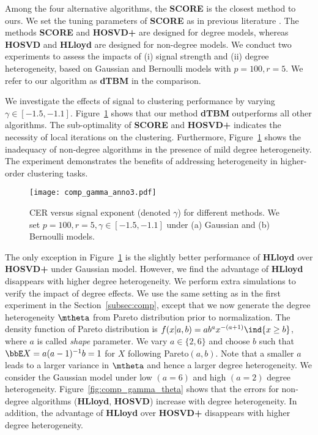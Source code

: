 \documentclass[lettersize,onecolumn,journal]{IEEEtran}
\theoremstyle{definition}
\theoremstyle{definition}
\begin{document}
Among the four alternative algorithms, the \textbf{\small SCORE} is the closest method to ours. We set the tuning parameters of \textbf{\small SCORE} as in previous literature \citep{ke2019community}. The methods \textbf{\small SCORE} and \textbf{\small HOSVD+} are designed for degree models, whereas \textbf{\small HOSVD} and \textbf{\small HLloyd} are designed for non-degree models. We conduct two experiments to assess the impacts of (i) signal strength and (ii) degree heterogeneity, based on Gaussian and Bernoulli models with $ p = 100, r = 5$. We refer to our algorithm as \textbf{\small dTBM} in the comparison. 

We investigate the effects of signal to clustering performance by varying $\gamma \in [-1.5, -1.1]$. Figure~\ref{fig:comp_gamma} shows that our method \textbf{\small dTBM} outperforms all other algorithms. The sub-optimality of \textbf{\small SCORE} and \textbf{\small HOSVD+} indicates the necessity of local iterations on the clustering. Furthermore,  Figure~\ref{fig:comp_gamma} shows the inadequacy of non-degree algorithms in the presence of mild degree heterogeneity. 
The experiment demonstrates the benefits of addressing heterogeneity in higher-order clustering tasks.   


\begin{figure}[h!]
    \centering
    \texttt{[image: comp\_gamma\_anno3.pdf]}
    \caption{CER versus signal exponent (denoted $\gamma$) for different methods. We set $p = 100, r = 5, \gamma \in [-1.5, -1.1]$ under (a) Gaussian and (b) Bernoulli models.}
    \label{fig:comp_gamma}
\end{figure}


The only exception in Figure~\ref{fig:comp_gamma} is the slightly better performance of \textbf{\small HLloyd} over \textbf{\small HOSVD+} under Gaussian model. However, we find the advantage of \textbf{\small HLloyd} disappears with higher degree heterogeneity. We perform extra simulations to verify the impact of degree effects. We use the same setting as in the first experiment in the Section~\ref{subsec:comp}, except that we now generate the degree heterogeneity $\mtheta$ from Pareto distribution prior to normalization. The density function of Pareto distribution is $f(x|a,b) = a b^a x^{-(a+1)} \ind\{ x \geq b \}$, where $a$ is called \emph{shape} parameter. We vary $a \in \{2,6\}$ and choose $b$ such that $\bbE X = a(a - 1)^{-1}b = 1$ for $X$ following Pareto$(a,b)$. Note that a smaller $a$ leads to a larger variance in $\mtheta$ and hence a larger degree heterogeneity. We consider the Gaussian model under low $(a = 6)$ and high $(a = 2)$ degree heterogeneity. Figure~\ref{fig:comp_gamma_theta} shows that the errors for non-degree algorithms (\textbf{\small HLloyd}, \textbf{\small HOSVD}) increase with degree heterogeneity. In addition, the advantage of \textbf{\small HLloyd} over \textbf{\small HOSVD+} disappears with higher degree heterogeneity. 
\end{document}
